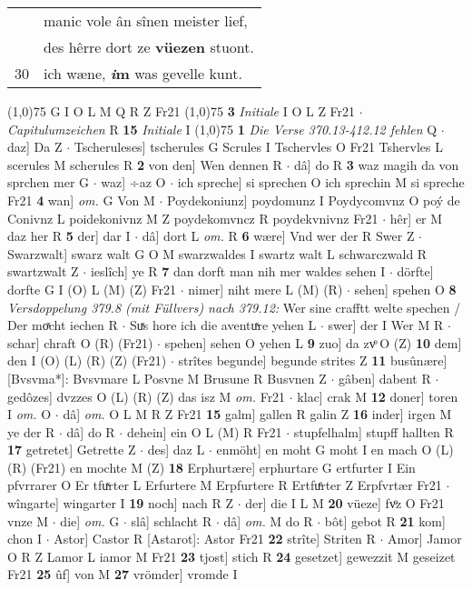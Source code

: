 \documentclass[8pt,a4paper,notitlepage]{article}
\begin{document}
\begin{table}[ht]
\begin{minipage}[t]{0.5\linewidth}
\begin{tabular}{rl}
 & manic vole ân sînen meister lief,\\ 
 & des hêrre dort ze \textbf{vüezen} stuont.\\ 
30 & ich wæne, \textbf{\textit{i}m} was gevelle kunt.\\ 
\end{tabular}
\scriptsize
\line(1,0){75} \newline
G I O L M Q R Z Fr21 \newline
\line(1,0){75} \newline
\textbf{3} \textit{Initiale} I O L Z Fr21   $\cdot$ \textit{Capitulumzeichen} R  \textbf{15} \textit{Initiale} I  \newline
\line(1,0){75} \newline
\textbf{1} \textit{Die Verse 370.13-412.12 fehlen} Q   $\cdot$ daz] Da Z  $\cdot$ Tscheruleses] tscherules G Scrules I Tschervles O Fr21 Tshervles L scerules M scherules R \textbf{2} von den] Wen dennen R  $\cdot$ dâ] do R \textbf{3} waz magih da von sprchen mer G  $\cdot$ waz] ÷az O  $\cdot$ ich spreche] si sprechen O ich sprechin M si spreche Fr21 \textbf{4} wan] \textit{om.} G Von M  $\cdot$ Poydekoniunz] poydomunz I Poydycomvnz O poý de Conivnz L poidekonivnz M Z poydekomvncz R poydekvnivnz Fr21  $\cdot$ hêr] er M daz her R \textbf{5} der] dar I  $\cdot$ dâ] dort L \textit{om.} R \textbf{6} wære] Vnd wer der R Swer Z  $\cdot$ Swarzwalt] swarz walt G O M swarzwaldes I swartz walt L schwarczwald R swartzwalt Z  $\cdot$ ieslîch] ye R \textbf{7} dan dorft man nih mer waldes sehen I  $\cdot$ dörfte] dorfte G I (O) L (M) (Z) Fr21  $\cdot$ nimer] niht mere L (M) (R)  $\cdot$ sehen] spehen O \textbf{8} \textit{Versdoppelung 379.8 (mit Füllvers) nach 379.12:} Wer sine crafftt welte spechen / Der moͯcht iechen R   $\cdot$ Suͯs hore ich die aventuͯre yehen L  $\cdot$ swer] der I Wer M R  $\cdot$ schar] chraft O (R) (Fr21)  $\cdot$ spehen] sehen O yehen L \textbf{9} zuo] da zvͦ O (Z) \textbf{10} dem] den I (O) (L) (R) (Z) (Fr21)  $\cdot$ strîtes begunde] begunde strites Z \textbf{11} busûnære] [Bvsvma*]: Bvsvmare L Posvne M Brusune R Busvnen Z  $\cdot$ gâben] dabent R  $\cdot$ gedôzes] dvzzes O (L) (R) (Z) das isz M \textit{om.} Fr21  $\cdot$ klac] crak M \textbf{12} doner] toren I \textit{om.} O  $\cdot$ dâ] \textit{om.} O L M R Z Fr21 \textbf{15} galm] gallen R galin Z \textbf{16} inder] irgen M ye der R  $\cdot$ dâ] do R  $\cdot$ dehein] ein O L (M) R Fr21  $\cdot$ stupfelhalm] stupff hallten R \textbf{17} getretet] Getrette Z  $\cdot$ des] daz L  $\cdot$ enmöht] en moht G moht I en mach O (L) (R) (Fr21) en mochte M (Z) \textbf{18} Erphurtære] erphurtare G ertfurter I Ein pfvrrarer O Er tfuͯrter L Erfurtere M Erpfurtere R Ertfuͤrter Z Erpfvrtær Fr21  $\cdot$ wîngarte] wingarter I \textbf{19} noch] nach R Z  $\cdot$ der] die I L M \textbf{20} vüeze] fvͦz O Fr21 vnze M  $\cdot$ die] \textit{om.} G  $\cdot$ slâ] schlacht R  $\cdot$ dâ] \textit{om.} M do R  $\cdot$ bôt] gebot R \textbf{21} kom] chon I  $\cdot$ Astor] Castor R [Astarot]: Astor Fr21 \textbf{22} strîte] Striten R  $\cdot$ Amor] Jamor O R Z Lamor L iamor M Fr21 \textbf{23} tjost] stich R \textbf{24} gesetzet] gewezzit M geseizet Fr21 \textbf{25} ûf] von M \textbf{27} vrömder] vromde I 
\end{minipage}
\end{table}
\end{document}
